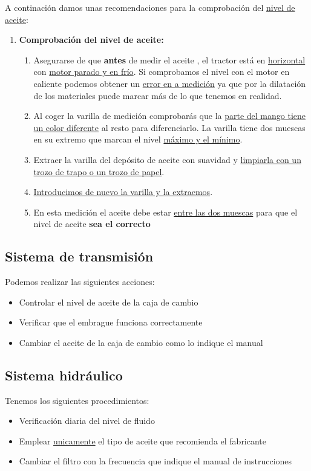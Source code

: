 \documentclass[a4paper,12pt,oneside]{book}
\begin{document}
A continación damos unas recomendaciones para la comprobación del \uline{nivel de aceite}:
\begin{enumerate}
\item \textbf{Comprobación del nivel de aceite:}
\label{sec:orgc27b449}
\begin{enumerate}
\item Asegurarse de que \textbf{antes} de medir el aceite , el tractor está en \uline{horizontal}
con \uline{motor parado y en frío}. Si comprobamos el nivel con el motor en caliente
podemos obtener un \uline{error en a medición} ya que por la dilatación de los
materiales puede marcar más de lo que tenemos en realidad.
\item Al coger la varilla de medición comprobarás que la \uline{parte del mango tiene un 
color diferente} al resto para diferenciarlo. La varilla tiene dos muescas en
su extremo que marcan el nivel \uline{máximo y el mínimo}.
\item Extraer la varilla del depósito de aceite con suavidad y \uline{limpiarla con un
trozo de trapo o un trozo de papel}.
\item \uline{Introducimos de nuevo la varilla y la extraemos}.
\item En esta medición el aceite debe estar \uline{entre las dos muescas} para que el
nivel de aceite \textbf{sea el correcto}
\end{enumerate}
\end{enumerate}

\subsection{Sistema de transmisión}
\label{sec:org3aaf63b}

Podemos realizar las siguientes acciones:
\begin{itemize}
\item Controlar el nivel de aceite de la caja de cambio
\item Verificar que el embrague funciona correctamente
\item Cambiar el aceite de la caja de cambio como lo indique el manual
\end{itemize}

\subsection{Sistema hidráulico}
\label{sec:orgdd36162}

Tenemos los siguientes procedimientos:
\begin{itemize}
\item Verificación diaria del nivel de fluido
\item Emplear \uline{unicamente} el tipo de aceite que recomienda el fabricante
\item Cambiar el filtro con la frecuencia que indique el manual de instrucciones
\end{itemize}
\end{document}

